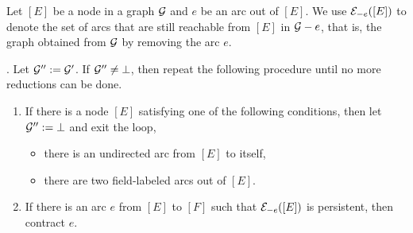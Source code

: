 \documentclass{llncs}
\begin{document}
\newcommand\nown{{\sf Nod_{own}}}

\newcommand\aown{{\sf Arc_{own}}}

Let $[E]$ be a node in a graph $\mathcal{G}$ and $e$ be an arc out of $[E]$. We use $\mathcal{E}_{-e}([E])$ to denote the set of arcs that are still reachable from $[E]$ in $\mathcal{G} - e$, that is, the graph obtained from $\mathcal{G}$ by removing the arc $e$.


\smallskip

. Let $\mathcal{G}'' :=\mathcal{G}'$. If $\mathcal{G}'' \neq \bot$, then repeat the following procedure until no more reductions can be done.
\begin{enumerate}
\item If there is a node $[E]$ satisfying one of the following conditions, then let $\mathcal{G}'':=\bot$ and exit the loop,
\begin{itemize}
\item there is an undirected arc from $[E]$ to itself,
%
\item there are two field-labeled arcs out of $[E]$.
\end{itemize}
%
\item If there is an arc $e$ from $[E]$ to $[F]$ such that $\mathcal{E}_{-e}([E])$ is persistent, then contract $e$.
\end{enumerate}

\end{document}
